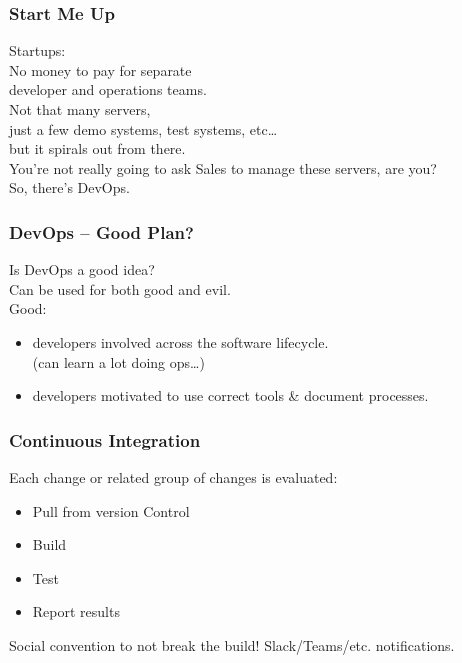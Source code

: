\begin{frame}
\frametitle{Start Me Up}

\Large

Startups:\\[1em]
No money to pay for separate \\
developer and operations teams.\\[1em]
Not that many servers, \\
just a few demo systems, test systems, etc\ldots\\
but it spirals out from there. \\[1em]
You're not really going to ask Sales to manage these servers, are you? \\
So, there's DevOps. 


\end{frame}



\begin{frame}
\frametitle{DevOps -- Good Plan?}

\large

Is DevOps a good idea? \\
Can be used for both good and evil. \\[1em]
Good:
\begin{itemize}
\item developers involved across the software lifecycle.\\
(can learn a lot doing ops\ldots )
\item developers motivated to use correct tools \& document processes.
\end{itemize}


\end{frame}



\begin{frame}
\frametitle{Continuous Integration}

Each change or related group of changes is evaluated:

\begin{itemize}
	\item Pull from version Control
	\item Build
	\item Test
	\item Report results
\end{itemize}

Social convention to not break the build! Slack/Teams/etc. notifications.

\end{frame}



